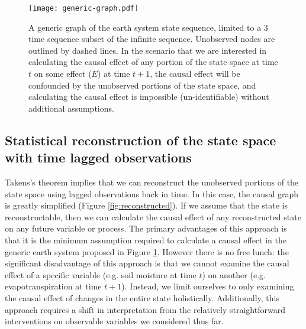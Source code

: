 \documentclass[12pt]{article}
\begin{document}
\begin{figure}
  \texttt{[image: generic-graph.pdf]}
  \caption{A generic graph of the earth system state sequence, limited
    to a 3 time sequence subset of the infinite sequence. Unobserved
    nodes are outlined by dashed lines.  In the scenario that we are
    interested in calculating the causal effect of any portion of the
    state space at time $t$ on some effect ($E$) at time $t+1$, the
    causal effect will be confounded by the unobserved portions of the
    state space, and calculating the causal effect is impossible
    (un-identifiable) without additional assumptions.}
  \label{fig:generic}
\end{figure}

\subsection{Statistical reconstruction of the state space with time
  lagged observations}
\label{sec:stat-reconstr-state}

Takens's theorem implies that we can reconstruct the unobserved
portions of the state space using lagged observations back in time. In
this case, the causal graph is greatly simplified (Figure
\ref{fig:reconstructed}). If we assume that the state is
reconstructable, then we can calculate the causal effect of any
reconstructed state on any future variable or process. The primary
advantages of this approach is that it is the minimum assumption
required to calculate a causal effect in the generic earth system
proposed in Figure \ref{fig:generic}. However there is no free lunch:
the significant disadvantage of this approach is that we cannot
examine the causal effect of a specific variable (e.g. soil moisture
at time $t$) on another (e.g. evapotranspiration at time
$t+1$). Instead, we limit ourselves to only examining the causal
effect of changes in the entire state holistically. Additionally, this
approach requires a shift in interpretation from the relatively
straightforward interventions on observable variables we considered
thus far.
\end{document}
